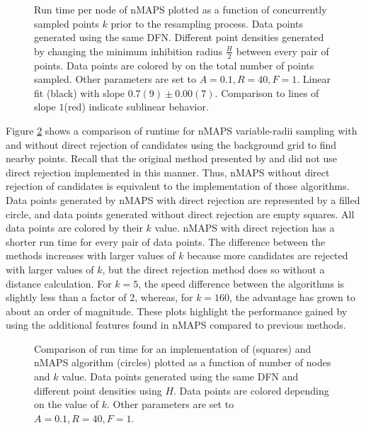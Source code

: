\documentclass[preprint, 10pt]{elsarticle}
\theoremstyle{definition}
\theoremstyle{remark}
\begin{document}
\begin{figure}
	\centering
	
	\caption{Run time per node of nMAPS plotted as a function of concurrently sampled points $k$ prior to the resampling process. 
    Data points generated using the same DFN.
    Different point densities generated by changing the minimum inhibition radius  $\frac{H}{2}$ between every pair of points. 
    Data points are colored by on the total number of points sampled. 
    Other parameters are set to $A=0.1, R=40, F=1$. 
    Linear fit (black) with slope $0.7(9)\pm 0.00(7)$. Comparison to lines of slope $1$(red) indicate sublinear behavior.}
	\label{fig:ktime}
\end{figure}

Figure \ref{fig:nodestimecomp} shows a comparison of runtime for nMAPS variable-radii sampling with and without direct rejection of candidates using the background grid to find nearby points. 
Recall that the original method presented by \cite{Bridson2007FastPD} and \cite{fastvar} did not use direct rejection implemented in this manner. 
Thus, nMAPS without direct rejection of candidates is equivalent to the implementation of those algorithms.
Data points generated by nMAPS with direct rejection are represented by a filled circle, and data points generated without direct rejection are empty squares. 
All data points are colored by their $k$ value. 
nMAPS with direct rejection has a shorter run time for every pair of data points. 
The difference between the methods increases with larger values of $k$ because more candidates are rejected with larger values of $k$, but the direct rejection method does so without a distance calculation. 
For $k = 5$, the speed difference between the algorithms is slightly less than a factor of 2, whereas, for $k = 160$, the advantage has grown to about an order of magnitude. 
These plots highlight the performance gained by using the additional features found in nMAPS compared to previous methods.


\begin{figure}
	\centering
	
	\caption{Comparison of run time for an implementation of \cite{Bridson2007FastPD,fastvar} (squares) and nMAPS algorithm (circles) plotted as a function of number of nodes and $k$ value. 
    Data points generated using the same DFN and different point densities using $H$. 
    Data points are colored depending on the value of $k$. 
    Other parameters are set to $A=0.1, R=40, F=1$. }
	\label{fig:nodestimecomp}
\end{figure}
\end{document}

